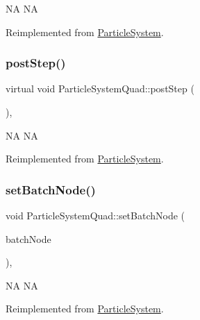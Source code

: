 NA  NA 

Reimplemented from \hyperlink{classParticleSystem_a95e820b4193a63ba26d0995224458744}{Particle\+System}.

\mbox{\label{classParticleSystemQuad_a8c357c48c5ade4091b73245068c8cbe3}} 
\subsubsection{\texorpdfstring{post\+Step()}{postStep()}\hspace{0.1cm}{\footnotesize\ttfamily [2/2]}}
{\footnotesize\ttfamily virtual void Particle\+System\+Quad\+::post\+Step (\begin{DoxyParamCaption}{ }\end{DoxyParamCaption})\hspace{0.3cm}{\ttfamily [override]}, {\ttfamily [virtual]}}

NA  NA 

Reimplemented from \hyperlink{classParticleSystem_a95e820b4193a63ba26d0995224458744}{Particle\+System}.

\mbox{\label{classParticleSystemQuad_a0609c28ee1074bae27e971af5693a37d}} 
\subsubsection{\texorpdfstring{set\+Batch\+Node()}{setBatchNode()}\hspace{0.1cm}{\footnotesize\ttfamily [1/2]}}
{\footnotesize\ttfamily void Particle\+System\+Quad\+::set\+Batch\+Node (\begin{DoxyParamCaption}\item[{\hyperlink{classParticleBatchNode}{Particle\+Batch\+Node} $\ast$}]{batch\+Node }\end{DoxyParamCaption})\hspace{0.3cm}{\ttfamily [override]}, {\ttfamily [virtual]}}

NA  NA 

Reimplemented from \hyperlink{classParticleSystem_a7758a2ae122f4fb48568412c3ce75146}{Particle\+System}.

